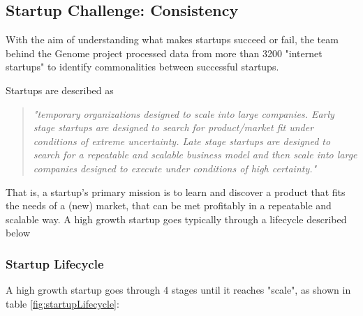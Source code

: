 \documentclass[a4paper,10pt]{book}
\begin{document}
\subsection{Startup Challenge: Consistency}
With the aim of understanding what makes startups succeed or fail, the team behind the Genome project processed
data from more than 3200 "internet startups" to identify commonalities between successful startups.

Startups are described as 
\begin{quote}
\emph{"temporary organizations designed to scale into large companies.
Early stage startups are designed to search for product/market fit under
conditions of extreme uncertainty. Late stage startups are designed to search for
a repeatable and scalable business model and then scale into large companies
designed to execute under conditions of high certainty."} \cite{genomePrematureScalingReport}
\end{quote}	
That is, a startup's primary mission is to learn and discover a product that fits the needs of a (new) market, 
that can be met profitably in a repeatable and scalable way.
A high growth startup goes typically through a lifecycle \cite{genomePrematureScalingReport} described below

\subsubsection{Startup Lifecycle}
A high growth startup goes through 4 stages until it reaches "scale", as shown in table \ref{fig:startupLifecycle}:
\end{document}
